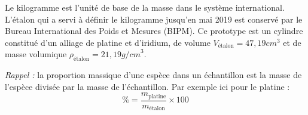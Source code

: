 Le kilogramme est l'unité de base de la masse dans le système international.
L'étalon qui a servi à définir le kilogramme jusqu'en mai 2019 est conservé par le Bureau International des Poids et Mesures (BIPM).
Ce prototype est un cylindre constitué d'un alliage de platine et d'iridium, de volume $V_\text{étalon} = 47,\!19 \unit{cm}^3$ et de masse volumique $\rho_\text{étalon} = 21,\!19 \unit{g/cm}^3$.



\textit{Rappel :} la proportion massique d'une espèce dans un échantillon est la masse de l'espèce divisée par la masse de l'échantillon. Par exemple ici pour le platine :
\begin{equation*}
  \% = \frac{m_\text{platine}}{m_\text{étalon}} \times 100
\end{equation*}

